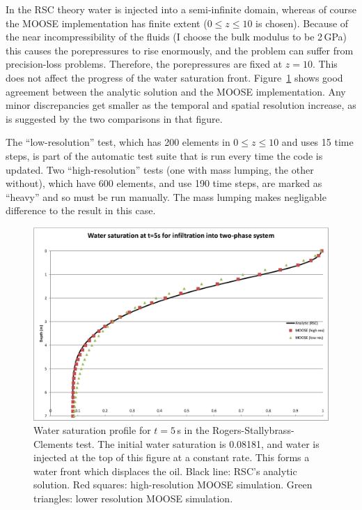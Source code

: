 \documentclass[]{scrreprt}
\begin{document}
In the RSC theory water is injected into a semi-infinite domain,
whereas of course the MOOSE implementation has finite extent ($0\leq z
\leq 10$ is chosen).  Because of the near incompressibility of the
fluids (I choose the bulk modulus to be 2\,GPa) this causes the
porepressures to rise enormously, and the problem can suffer from
precision-loss problems.  Therefore, the porepressures are fixed at
$z=10$.  This does not affect the progress of the water saturation
front.  Figure~\ref{rsc.fig} shows good agreement between the analytic
solution and the MOOSE implementation.  Any minor discrepancies get
smaller as the temporal and spatial resolution increase, as is
suggested by the two comparisons in that figure.

The ``low-resolution'' test, which has 200 elements in $0\leq z\leq
10$ and uses 15 time steps, is part of the automatic test suite that
is run every time the code is updated.  Two ``high-resolution'' tests
(one with mass lumping, the other without),
which have 600 elements, and use 190 time steps, are marked as
``heavy'' and so must be run manually.  The mass lumping makes
negligable difference to the result in this case.

\begin{figure}[htb]
\begin{center}
\includegraphics[width=16cm]{rsc.eps}
\caption{Water saturation profile for $t=5$\,s in the
  Rogers-Stallybrass-Clements test.  The initial water saturation is
  0.08181, and water is injected at the top of this figure at a
  constant rate.  This forms a water front which displaces the oil.
  Black line: RSC's analytic solution.  Red squares: high-resolution
  MOOSE simulation.  Green triangles: lower resolution MOOSE simulation.}
\label{rsc.fig}
\end{center}
\end{figure}
\end{document}
